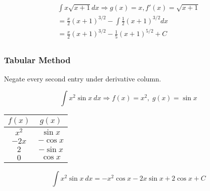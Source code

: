 \begin{gather*}
    \int{x\sqrt{x+1}}dx \Rightarrow g(x)=x, f'(x)=\sqrt{x+1}\\
    =\frac{x}{2}(x+1)^{3/2}-\int{\frac{1}{2}(x+1)^{3/2}}dx\\
    =\frac{x}{2}(x+1)^{3/2}-\frac{1}{5}(x+1)^{5/2}+C\\
\end{gather*}

\subsubsection{Tabular Method}

Negate every second entry under derivative column.

\[\int{x^2\sin{x}}\:dx \Rightarrow f(x)=x^2,\;g(x)=\sin{x}\]

\begin{center}
    \begin{tabular}{|c|c|}
        \hline
        $f(x)$ & $g(x)$\\
        \hline
        $x^2$ & $\sin{x}$\\
        \hline
        $-2x$ & $-\cos{x}$\\
        \hline
        $2$ & $-\sin{x}$\\
        \hline
        $0$ & $\cos{x}$\\
        \hline
    \end{tabular}
\end{center}

\[\int{x^2\sin{x}}\:dx=-x^2\cos{x}-2x\sin{x}+2\cos{x}+C\]